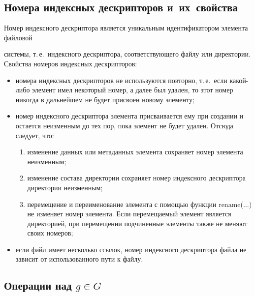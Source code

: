 \begin{multicols}{2}
\vspace*{-4pt}
\subsection{Номера индексных дескрипторов и~их~свойства}

\vspace*{-2pt}

      Номер индексного дескриптора является уникальным идентификатором 
элемента файловой\linebreak
\vspace*{-12pt}
\pagebreak

\noindent
 сис\-те\-мы, т.\,е.\ индексного дескриптора, соответствующего 
файлу или директории.  Свойства номеров индексных дескрипторов:
      \begin{itemize}
\item номера индексных дескрипторов не используются повторно, т.\,е.\ если 
какой-либо элемент имел некоторый номер, а далее был удален, то этот 
номер никогда в дальнейшем не будет присвоен новому элементу;
\item номер индексного дескриптора элемента присваивается ему при 
создании и остается неизменным до тех пор, пока элемент не будет удален. 
Отсюда следует, что:
\begin{enumerate}[(1)]
\item изменение данных или метаданных элемента сохраняет номер 
элемента неизменным;
\item изменение состава директории сохраняет номер индексного 
дескриптора директории неизменным;
\item перемещение и переименование элемента с помощью функции 
rename($\ldots$) не изменяет номер элемента. Если перемещаемый 
элемент является директорией, при перемещении подчиненные 
элементы также не меняют своих номеров;
\end{enumerate}
\item если файл имеет несколько ссылок, номер индексного дескриптора 
файла не зависит от использованного пути к файлу. 
\end{itemize}

\subsection{Операции над $g\in G$}
     

\end{multicols}
